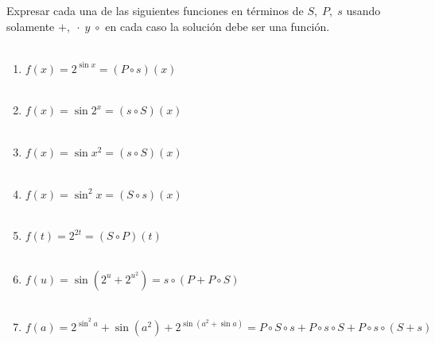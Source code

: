 \begin{ej}
Expresar cada una de las siguientes funciones en términos de $S, \; P, \; s$ usando solamente $+, \; \cdot \; y \; \circ$ en cada caso la solución debe ser una función.\\\\
\begin{enumerate}[\bfseries i)]
\item $f(x) = 2^{\sin x} = (P \circ s)(x)$\\\\
\item $f(x)=\sin 2^x = (s \circ S)(x)$\\\\
\item $f(x) = \sin x^2 = (s \circ S)(x)$\\\\
\item $f(x) = \sin^2 x = (S \circ s)(x)$\\\\
\item $f(t) = 2^{2t} = (S \circ P)(t)$\\\\
\item $f(u) = \sin(2^u + 2^{u^{2}}) = s \circ ( P + P \circ S )$\\\\
\item $f(a) = 2^{\sin^2 a} + \sin(a^2) + 2^{\sin(a^2 + \sin a)} = P \circ S \circ s + P \circ s \circ S + P \circ s \circ (S + s)$\\\\
\end{enumerate}
\end{ej}

